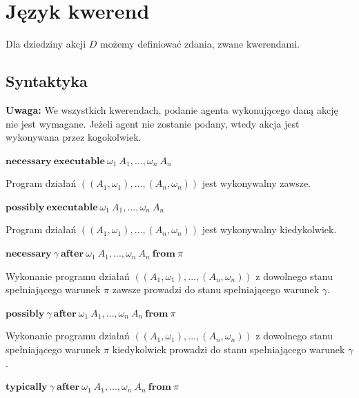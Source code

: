 \documentclass[11pt,a4paper]{article}
\begin{document}
    \section{Język kwerend}
    
	Dla dziedziny akcji $D$ możemy definiować zdania, zwane kwerendami.  
    
    \subsection{Syntaktyka}
    
    \textbf{Uwaga:} We wszystkich kwerendach, podanie agenta wykonującego daną akcję nie jest wymagane. Jeżeli agent nie zostanie podany, wtedy akcja jest wykonywana przez kogokolwiek.
    
    \begin{center}
        $\mathbf{necessary}~\mathbf{executable}~\omega_1~A_1, ..., \omega_n~A_n$
    \end{center}
    
    Program działań $((A_1, \omega_1),...,(A_n, \omega_n))$ jest wykonywalny zawsze.
    
    \begin{center}
        $\mathbf{possibly}~\mathbf{executable}~\omega_1~A_1, ..., \omega_n~A_n$
    \end{center}
    
    Program działań $((A_1, \omega_1),...,(A_n, \omega_n))$ jest wykonywalny kiedykolwiek.
    
    \begin{center}
        $\mathbf{necessary}~\gamma~\mathbf{after}~\omega_1~A_1, ..., \omega_n~A_n~\mathbf{from}~\pi$
    \end{center}
    
    Wykonanie programu działań $((A_1, \omega_1),...,(A_n, \omega_n))$ z dowolnego stanu spełniającego  warunek $\pi$ zawsze prowadzi do stanu spełniającego warunek $\gamma$.
    
    \begin{center}
        $\mathbf{possibly}~\gamma~\mathbf{after}~\omega_1~A_1, ..., \omega_n~A_n~\mathbf{from}~\pi$
    \end{center}
    
    Wykonanie programu działań $((A_1, \omega_1),...,(A_n, \omega_n))$ z dowolnego stanu spełniającego  warunek $\pi$ kiedykolwiek prowadzi do stanu spełniającego warunek $\gamma$.
    
    \begin{center}
        $\mathbf{typically}~\gamma~\mathbf{after}~\omega_1~A_1, ..., \omega_n~A_n~\mathbf{from}~\pi$
    \end{center}
    
\end{document}
